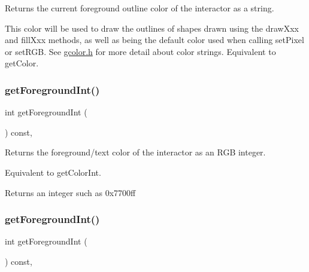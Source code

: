 Returns the current foreground outline color of the interactor as a string. 

This color will be used to draw the outlines of shapes drawn using the draw\+Xxx and fill\+Xxx methods, as well as being the default color used when calling set\+Pixel or set\+R\+GB. See \mbox{\hyperlink{gcolor_8h_source}{gcolor.\+h}} for more detail about color strings. Equivalent to get\+Color. \mbox{\label{classGInteractor_ac3b12ab385a6ef9ae90fc879860ba726}} 
\subsubsection{\texorpdfstring{get\+Foreground\+Int()}{getForegroundInt()}\hspace{0.1cm}{\footnotesize\ttfamily [1/2]}}
{\footnotesize\ttfamily int get\+Foreground\+Int (\begin{DoxyParamCaption}{ }\end{DoxyParamCaption}) const\hspace{0.3cm}{\ttfamily [virtual]}, {\ttfamily [inherited]}}



Returns the foreground/text color of the interactor as an R\+GB integer. 

Equivalent to get\+Color\+Int. \begin{DoxyReturn}{Returns}
an integer such as 0x7700ff 
\end{DoxyReturn}
\mbox{\label{classGDrawingSurface_ac3b12ab385a6ef9ae90fc879860ba726}} 
\subsubsection{\texorpdfstring{get\+Foreground\+Int()}{getForegroundInt()}\hspace{0.1cm}{\footnotesize\ttfamily [2/2]}}
{\footnotesize\ttfamily int get\+Foreground\+Int (\begin{DoxyParamCaption}{ }\end{DoxyParamCaption}) const\hspace{0.3cm}{\ttfamily [virtual]}, {\ttfamily [inherited]}}



